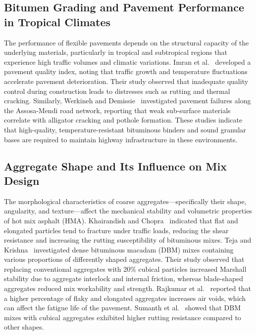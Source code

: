 \documentclass[12pt,a4paper]{article}
\begin{document}
\subsection{Bitumen Grading and Pavement Performance in Tropical Climates}
The performance of flexible pavements depends on the structural capacity of the underlying materials, particularly in tropical and subtropical regions that experience high traffic volumes and climatic variations. Imran et al.~\cite{imran2025developing} developed a pavement quality index, noting that traffic growth and temperature fluctuations accelerate pavement deterioration. Their study observed that inadequate quality control during construction leads to distresses such as rutting and thermal cracking. Similarly, Werkineh and Demissie~\cite{werkineh2020assessment} investigated pavement failures along the Assosa-Mendi road network, reporting that weak sub-surface materials correlate with alligator cracking and pothole formation. These studies indicate that high-quality, temperature-resistant bituminous binders and sound granular bases are required to maintain highway infrastructure in these environments.

\subsection{Aggregate Shape and Its Influence on Mix Design}
The morphological characteristics of coarse aggregates---specifically their shape, angularity, and texture---affect the mechanical stability and volumetric properties of hot mix asphalt (HMA). Khairandish and Chopra~\cite{khairandish2020influence} indicated that flat and elongated particles tend to fracture under traffic loads, reducing the shear resistance and increasing the rutting susceptibility of bituminous mixes. Teja and Krishna~\cite{teja2020effect} investigated dense bituminous macadam (DBM) mixes containing various proportions of differently shaped aggregates. Their study observed that replacing conventional aggregates with 20\% cubical particles increased Marshall stability due to aggregate interlock and internal friction, whereas blade-shaped aggregates reduced mix workability and strength. Rajkumar et al.~\cite{rajkumar2018experimental} reported that a higher percentage of flaky and elongated aggregates increases air voids, which can affect the fatigue life of the pavement. Sumanth et al.~\cite{sumanth2017study} showed that DBM mixes with cubical aggregates exhibited higher rutting resistance compared to other shapes.
\end{document}
